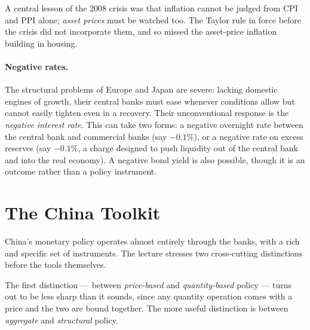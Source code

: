 \begin{remark}
A central lesson of the 2008 crisis was that inflation cannot be judged from CPI and PPI alone; \emph{asset prices} must be watched too. The Taylor rule in force before the crisis did not incorporate them, and so missed the asset-price inflation building in housing.
\end{remark}

\paragraph{Negative rates.} The structural problems of Europe and Japan are severe: lacking domestic engines of growth, their central banks must ease whenever conditions allow but cannot easily tighten even in a recovery. Their unconventional response is the \emph{negative interest rate}. This can take two forms: a negative overnight rate between the central bank and commercial banks (say $-0.1\%$), or a negative rate on excess reserves (say $-0.1\%$, a charge designed to push liquidity out of the central bank and into the real economy). A negative bond yield is also possible, though it is an outcome rather than a policy instrument.


\section{The China Toolkit}

China's monetary policy operates almost entirely through the banks, with a rich and specific set of instruments. The lecture stresses two cross-cutting distinctions before the tools themselves.

The first distinction --- between \emph{price-based} and \emph{quantity-based} policy --- turns out to be less sharp than it sounds, since any quantity operation comes with a price and the two are bound together. The more useful distinction is between \emph{aggregate} and \emph{structural} policy.


